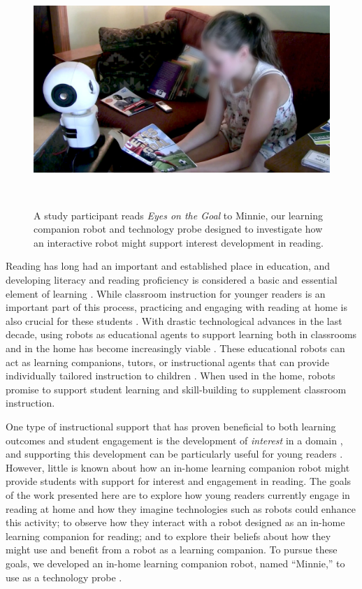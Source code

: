 \documentclass{sigchi}
\begin{document}
\begin{figure}[t]
	\centering
	\includegraphics[width=1\columnwidth]{figures/chi17-michaelis-figures-teaser2.jpg}
	\caption{A study participant reads \textit{Eyes on the Goal} to Minnie, our learning companion robot and technology probe designed to investigate how an interactive robot might support interest development in reading.}~\label{fig:teaser}
	\vspace{-8pt}
\end{figure}

Reading has long had an important and established place in education, and developing literacy and reading proficiency is considered a basic and essential element of learning \cite{McCormick:1994,Freire:1983}. While classroom instruction for younger readers is an important part of this process, practicing and engaging with reading at home is also crucial for these students \cite{Baker:1997}. With drastic technological advances in the last decade, using robots as educational agents to support learning both in classrooms and in the home has become increasingly viable \cite{Benitti:2012}. These educational robots can act as learning companions, tutors, or instructional agents that can provide individually tailored instruction to children \cite{Miller:2008}. When used in the home, robots promise to support student learning and skill-building to supplement classroom instruction.

One type of instructional support that has proven beneficial to both learning outcomes and student engagement is the development of \textit{interest} in a domain \cite{Hidi:2006}, and supporting this development can be particularly useful for young readers \cite{Jones:2011}. However, little is known about how an in-home learning companion robot might provide students with support for interest and engagement in reading. The goals of the work presented here are to explore how young readers currently engage in reading at home and how they imagine technologies such as robots could enhance this activity; to observe how they interact with a robot designed as an in-home learning companion for reading; and to explore their beliefs about how they might use and benefit from a robot as a learning companion. To pursue these goals, we developed an in-home learning companion robot, named ``Minnie,'' to use as a technology probe \cite{Hutchinson:2003}.
\end{document}
